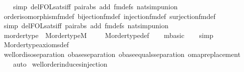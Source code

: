 \begin{isabellebody}
\ \ \isamarkupfalse%
\ {\isacharparenleft}{\kern0pt}simp\ del{\isacharcolon}{\kern0pt}FOL{\isacharunderscore}{\kern0pt}sats{\isacharunderscore}{\kern0pt}iff\ pair{\isacharunderscore}{\kern0pt}abs\ add{\isacharcolon}{\kern0pt}\ fm{\isacharunderscore}{\kern0pt}defs\ nat{\isacharunderscore}{\kern0pt}simp{\isacharunderscore}{\kern0pt}union{\isacharparenright}{\kern0pt}\isanewline
\ \ \isamarkupfalse%
\ order{\isacharunderscore}{\kern0pt}isomorphism{\isacharunderscore}{\kern0pt}fm{\isacharunderscore}{\kern0pt}def\ bijection{\isacharunderscore}{\kern0pt}fm{\isacharunderscore}{\kern0pt}def\ injection{\isacharunderscore}{\kern0pt}fm{\isacharunderscore}{\kern0pt}def\ surjection{\isacharunderscore}{\kern0pt}fm{\isacharunderscore}{\kern0pt}def\isanewline
\ \ \isamarkupfalse%
\ {\isacharparenleft}{\kern0pt}simp\ del{\isacharcolon}{\kern0pt}FOL{\isacharunderscore}{\kern0pt}sats{\isacharunderscore}{\kern0pt}iff\ pair{\isacharunderscore}{\kern0pt}abs\ add{\isacharcolon}{\kern0pt}\ fm{\isacharunderscore}{\kern0pt}defs\ nat{\isacharunderscore}{\kern0pt}simp{\isacharunderscore}{\kern0pt}union{\isacharparenright}{\kern0pt}\isanewline
\ \ \isamarkupfalse%
%
\endisatagproof
{\isafoldproof}%
%
\isadelimproof
\isanewline
%
\endisadelimproof
\isanewline
{}\isamarkupfalse%
\ mordertype\ {\isacharcolon}{\kern0pt}\ {\isachardoublequoteopen}M{\isacharunderscore}{\kern0pt}ordertype{\isacharparenleft}{\kern0pt}{\isacharhash}{\kern0pt}{\isacharhash}{\kern0pt}M{\isacharparenright}{\kern0pt}{\isachardoublequoteclose}\ \isanewline
%
\isadelimproof
\ \ %
\endisadelimproof
%
\isatagproof
{}\isamarkupfalse%
\ M{\isacharunderscore}{\kern0pt}ordertype{\isacharunderscore}{\kern0pt}def\isanewline
\ \ \isamarkupfalse%
\ mbasic\isanewline
\ \ \isamarkupfalse%
\ simp\isanewline
\ \ \isamarkupfalse%
\ M{\isacharunderscore}{\kern0pt}ordertype{\isacharunderscore}{\kern0pt}axioms{\isacharunderscore}{\kern0pt}def\isanewline
\ \ \isamarkupfalse%
\ well{\isacharunderscore}{\kern0pt}ord{\isacharunderscore}{\kern0pt}iso{\isacharunderscore}{\kern0pt}separation\ obase{\isacharunderscore}{\kern0pt}separation\ obase{\isacharunderscore}{\kern0pt}equals{\isacharunderscore}{\kern0pt}separation\ omap{\isacharunderscore}{\kern0pt}replacement\isanewline
\ \ \isamarkupfalse%
\ auto%
\endisatagproof
{\isafoldproof}%
%
\isadelimproof
\isanewline
%
\endisadelimproof
\isanewline
{}\isamarkupfalse%
\ wellorder{\isacharunderscore}{\kern0pt}induces{\isacharunderscore}{\kern0pt}injection\ {\isacharcolon}{\kern0pt}\ \isanewline

\end{isabellebody}
